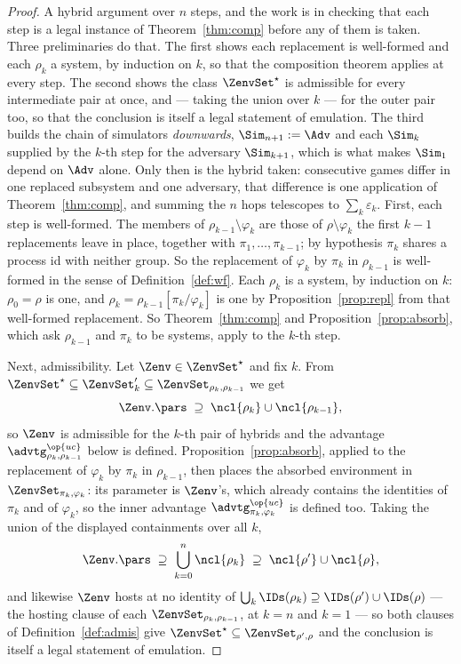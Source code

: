 \documentclass[10pt,oneside,openany]{book}
\theoremstyle{accentdef}
\theoremstyle{accentplain}
\begin{document}
\begin{proof}
A hybrid argument over $n$ steps, and the work is in checking that each step is a legal instance of
Theorem~\ref{thm:comp} before any of them is taken. Three preliminaries do that. The first shows
each replacement is well-formed and each $\rho_k$ a system, by induction on $k$, so that the
composition theorem applies at every step. The second shows the class $\ZenvSet^{\star}$ is
admissible for every intermediate pair at once, and --- taking the union over $k$ --- for the outer
pair too, so that the conclusion is itself a legal statement of emulation. The third builds the
chain of simulators \emph{downwards}, $\Sim_{n+1} := \Adv$ and each $\Sim_k$ supplied by the $k$-th
step for the adversary $\Sim_{k+1}$, which is what makes $\Sim_1$ depend on $\Adv$ alone. Only then
is the hybrid taken: consecutive games differ in one replaced subsystem and one adversary, that
difference is one application of Theorem~\ref{thm:comp}, and summing the $n$ hops telescopes to
$\sum_k \varepsilon_k$.
First, each step is well-formed. The members of $\rho_{k-1} \setminus \varphi_k$ are those of
$\rho \setminus \varphi_k$ the first $k-1$ replacements leave in place, together with
$\pi_1,\dots,\pi_{k-1}$; by hypothesis $\pi_k$ shares a process id with neither group. So the
replacement of $\varphi_k$ by $\pi_k$ in $\rho_{k-1}$ is well-formed in the sense of
Definition~\ref{def:wf}. Each $\rho_k$ is a system, by induction on $k$: $\rho_0 = \rho$ is one,
and $\rho_k = \rho_{k-1}[\pi_k/\varphi_k]$ is one by Proposition~\ref{prop:repl} from that
well-formed replacement. So Theorem~\ref{thm:comp} and Proposition~\ref{prop:absorb}, which ask
$\rho_{k-1}$ and $\pi_k$ to be systems, apply to the $k$-th step.

Next, admissibility. Let $\Zenv \in \ZenvSet^{\star}$ and fix $k$. From $\ZenvSet^{\star} \subseteq \ZenvSet_k' \subseteq \ZenvSet_{\rho_k,\rho_{k-1}}$
we get
\[
  \Zenv.\pars \;\supseteq\; \ncl{\rho_k} \cup \ncl{\rho_{k-1}} ,
\]
so $\Zenv$ is admissible for the $k$-th pair of hybrids and the advantage
$\advtg^{\op{uc}}_{\rho_k,\rho_{k-1}}$ below is defined. Proposition~\ref{prop:absorb},
applied to the replacement of $\varphi_k$ by $\pi_k$ in $\rho_{k-1}$, then places the absorbed
environment in $\ZenvSet_{\pi_k,\varphi_k}$: its parameter is $\Zenv$'s, which already contains
the identities of $\pi_k$ and of $\varphi_k$, so the inner advantage
$\advtg^{\op{uc}}_{\pi_k,\varphi_k}$ is defined too. Taking the union of the displayed
containments over all $k$,
\[
  \Zenv.\pars \;\supseteq\; \bigcup_{k=0}^{n} \ncl{\rho_k} \;\supseteq\; \ncl{\rho'} \cup \ncl{\rho} ,
\]
and likewise $\Zenv$ hosts at no identity of $\bigcup_k \IDs(\rho_k) \supseteq \IDs(\rho') \cup \IDs(\rho)$
--- the hosting clause of each $\ZenvSet_{\rho_k,\rho_{k-1}}$, at $k = n$ and $k = 1$ ---
so both clauses of Definition~\ref{def:admis} give $\ZenvSet^{\star} \subseteq \ZenvSet_{\rho',\rho}$
and the conclusion is itself a legal
statement of emulation.


\end{proof}
\end{document}
